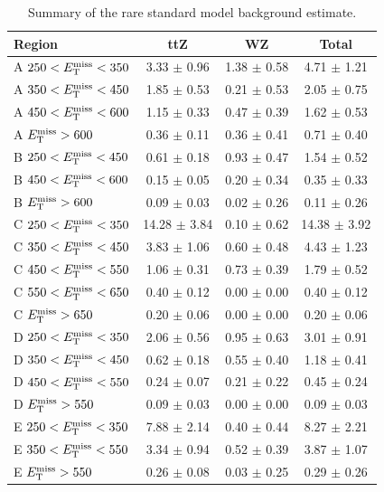 \begin{table}[htbp]
\centering
\caption{Summary of the rare standard model background
  estimate.}
\label{tab:stop:rarebkg:results}
\begin{tabular}{|l|cc|c|}
\hline
Region & ttZ & WZ & Total  \\
\hline
 A $250<E_\text{T}^\text{miss}<350$ & 3.33 $\pm$ 0.96   & 1.38 $\pm$ 0.58   & 4.71 $\pm$ 1.21   \\
 A $350<E_\text{T}^\text{miss}<450$ & 1.85 $\pm$ 0.53   & 0.21 $\pm$ 0.53   & 2.05 $\pm$ 0.75   \\
 A $450<E_\text{T}^\text{miss}<600$ & 1.15 $\pm$ 0.33   & 0.47 $\pm$ 0.39   & 1.62 $\pm$ 0.53   \\
 A $E_\text{T}^\text{miss}>600$ & 0.36 $\pm$ 0.11   & 0.36 $\pm$ 0.41   & 0.71 $\pm$ 0.40   \\
\hline
 B $250<E_\text{T}^\text{miss}<450$ & 0.61 $\pm$ 0.18   & 0.93 $\pm$ 0.47   & 1.54 $\pm$ 0.52   \\
 B $450<E_\text{T}^\text{miss}<600$ & 0.15 $\pm$ 0.05   & 0.20 $\pm$ 0.34   & 0.35 $\pm$ 0.33   \\
 B $E_\text{T}^\text{miss}>600$ & 0.09 $\pm$ 0.03   & 0.02 $\pm$ 0.26   & 0.11 $\pm$ 0.26   \\
\hline
 C $250<E_\text{T}^\text{miss}<350$ & 14.28 $\pm$ 3.84  & 0.10 $\pm$ 0.62   & 14.38 $\pm$ 3.92  \\
 C $350<E_\text{T}^\text{miss}<450$ & 3.83 $\pm$ 1.06   & 0.60 $\pm$ 0.48   & 4.43 $\pm$ 1.23   \\
 C $450<E_\text{T}^\text{miss}<550$ & 1.06 $\pm$ 0.31   & 0.73 $\pm$ 0.39   & 1.79 $\pm$ 0.52   \\
 C $550<E_\text{T}^\text{miss}<650$ & 0.40 $\pm$ 0.12   & 0.00 $\pm$ 0.00   & 0.40 $\pm$ 0.12   \\
 C $E_\text{T}^\text{miss}>650$ & 0.20 $\pm$ 0.06   & 0.00 $\pm$ 0.00   & 0.20 $\pm$ 0.06   \\
\hline
 D $250<E_\text{T}^\text{miss}<350$ & 2.06 $\pm$ 0.56   & 0.95 $\pm$ 0.63   & 3.01 $\pm$ 0.91   \\
 D $350<E_\text{T}^\text{miss}<450$ & 0.62 $\pm$ 0.18   & 0.55 $\pm$ 0.40   & 1.18 $\pm$ 0.41   \\
 D $450<E_\text{T}^\text{miss}<550$ & 0.24 $\pm$ 0.07   & 0.21 $\pm$ 0.22   & 0.45 $\pm$ 0.24   \\
 D $E_\text{T}^\text{miss}>550$ & 0.09 $\pm$ 0.03   & 0.00 $\pm$ 0.00   & 0.09 $\pm$ 0.03   \\
\hline
 E $250<E_\text{T}^\text{miss}<350$ & 7.88 $\pm$ 2.14   & 0.40 $\pm$ 0.44   & 8.27 $\pm$ 2.21   \\
 E $350<E_\text{T}^\text{miss}<550$ & 3.34 $\pm$ 0.94   & 0.52 $\pm$ 0.39   & 3.87 $\pm$ 1.07   \\
 E $E_\text{T}^\text{miss}>550$ & 0.26 $\pm$ 0.08   & 0.03 $\pm$ 0.25   & 0.29 $\pm$ 0.26   \\

\end{tabular}
\end{table}
